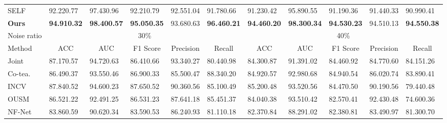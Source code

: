 \begin{table*}[]
\begin{tabular}{@{}lllllllllll@{}}
SELF                            & 92.220.77          & 97.430.96          & 92.210.79               & 92.551.04          & 91.780.66             & 91.230.42          & 95.890.55          & 91.190.36               & 91.440.33          & 90.990.41             \\
\textbf{Ours}                   & \textbf{94.910.32} & \textbf{98.400.57} & \textbf{95.050.35}      & 93.680.63          & \textbf{96.460.21}    & \textbf{94.460.20} & \textbf{98.300.34} & \textbf{94.530.23}      & 94.510.13          & \textbf{94.550.38}    \\ \midrule
\multicolumn{1}{c}{Noise ratio} & \multicolumn{5}{c}{30\%}                                                                                                                & \multicolumn{5}{c}{40\%}                                                                                                                \\ \midrule
Method                & \multicolumn{1}{c}{ACC} & \multicolumn{1}{c}{AUC} & \multicolumn{1}{c}{F1 Score} & \multicolumn{1}{c}{{Precision}} & \multicolumn{1}{c}{Recall} & \multicolumn{1}{c}{ACC} & \multicolumn{1}{c}{AUC} & \multicolumn{1}{c}{F1 Score} & \multicolumn{1}{c}{{Precision}} & \multicolumn{1}{c}{Recall} \\ \midrule
Joint                     & 87.170.57          & 94.720.63          & 86.410.66               & 93.340.27          & 80.440.98             & 84.300.87          & 91.391.02          & 84.460.92               & 84.770.60          & 84.151.26             \\
Co-tea.                     & 86.490.37          & 93.550.46          & 86.900.33               & 85.500.47          & 88.340.20    & 84.920.57          & 92.980.68          & 84.940.54               & 86.020.74          & 83.890.41             \\
INCV                            & 87.840.52          & 94.600.23          & 87.650.52               & 90.360.56          & 85.100.49             & 85.200.48          & 93.520.56          & 84.470.50               & 90.190.56          & 79.440.48             \\
OUSM                       & 86.521.22          & 92.491.25          & 86.531.23               & 87.641.18          & 85.451.37             & 84.040.38          & 93.510.42          & 82.570.41               & 92.430.48          & 74.600.36             \\
NF-Net                          & 83.860.59          & 90.620.34          & 83.590.53               & 86.240.93          & 81.110.18             & 82.370.84          & 88.291.02          & 82.380.81               & 83.490.97          & 81.300.70             \\

\end{tabular}
\end{table*}
